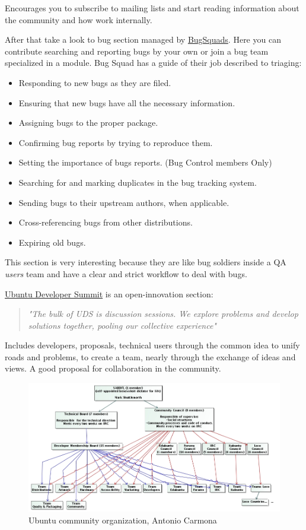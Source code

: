 \par Encourages you to subscribe to mailing lists and start reading information about the community and how work internally.

\par After that take a look to bug section managed by \href{https://wiki.ubuntu.com/BugSquad}{BugSquads}. Here you can contribute searching and reporting bugs by your own or join a bug team specialized in a module. Bug Squad has a guide of their job described to triaging:

\begin{itemize}
	\item Responding to new bugs as they are filed.
	\item Ensuring that new bugs have all the necessary information.
	\item Assigning bugs to the proper package.
	\item Confirming bug reports by trying to reproduce them.
	\item Setting the importance of bugs reports. (Bug Control members Only)
	\item Searching for and marking duplicates in the bug tracking system.
	\item Sending bugs to their upstream authors, when applicable.
	\item Cross-referencing bugs from other distributions.
	\item Expiring old bugs.
\end{itemize} This section is very interesting because they are like bug soldiers inside a QA \textit{users} team and have a clear and strict workflow to deal with bugs.

\par \href{http://uds.ubuntu.com/}{Ubuntu Developer Summit} is an open-innovation section:

\begin{quote}
    \par \textit{"The bulk of UDS is discussion sessions. We explore problems and develop solutions together, pooling our collective experience"}
\end{quote}

\par Includes developers, proposals, technical users through the common idea to unify roads and problems, to create a team, nearly through the exchange of ideas and views. A good proposal for collaboration in the community.

\begin{figure}
  \caption{Ubuntu community organization, Antonio Carmona}
    \centering
\includegraphics[width=\textwidth]{../images/MSWL-CSII-UbuntuCommunityRicardo-ACarmona.jpg}
\end{figure}

